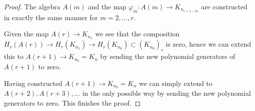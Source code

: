 \begin{proof}
\medskip\noindent
The algebra $A(m)$ and the map $\varphi_m : A(m) \to K_{n_{r + 1 - m}}$
are constructed in exactly the same manner for $m = 2, \ldots, r$.

\medskip\noindent
Given the map $A(r) \to K_{n_1}$ we see that the composition
$H_r(A(r)) \to H_r(K_{n_1}) \to H_r(K_{n_0}) \subset (K_{n_0})_r$
is zero, hence we can extend this to $A(r + 1) \to K_{n_0} = K_n$
by sending the new polynomial generators of $A(r + 1)$ to zero.

\medskip\noindent
Having constructed $A(r + 1) \to K_{n_0} = K_n$ we can simply
extend to $A(r + 2), A(r + 3), \ldots$ in the only possible way
by sending the new polynomial generators to zero.
This finishes the proof.
\end{proof}











